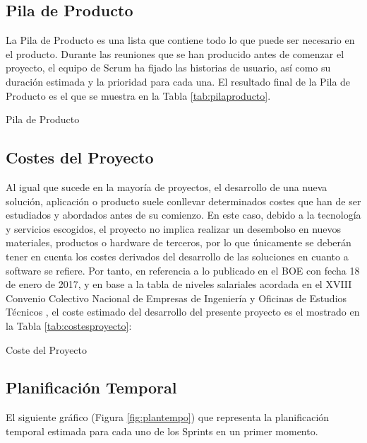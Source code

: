 \subsection{Pila de Producto}
La Pila de Producto es una lista que contiene todo lo que puede ser necesario en el producto. Durante las reuniones que se han producido antes de comenzar el proyecto, el equipo de Scrum ha fijado las historias de usuario, así como su duración estimada y la prioridad para cada una. El resultado final de la Pila de Producto es el que se muestra en la Tabla \ref{tab:pilaproducto}.

\begin{table}[!htbp]
	\centering
	{\small
		
	}
	\caption[Pila de Producto]
	{Pila de Producto}
	\label{tab:pilaproducto}
\end{table}

\clearpage

\subsection{Costes del Proyecto}
Al igual que sucede en la mayoría de proyectos, el desarrollo de una nueva solución, aplicación o producto suele conllevar determinados costes que han de ser estudiados y abordados antes de su comienzo. En este caso, debido a la tecnología y servicios escogidos, el proyecto no implica realizar un desembolso en nuevos materiales, productos o hardware de terceros, por lo que únicamente se deberán tener en cuenta los costes derivados del desarrollo de las soluciones en cuanto a software se refiere. Por tanto, en referencia a lo publicado en el \acf{BOE} con fecha 18 de enero de 2017, y en base a la tabla de niveles salariales acordada en el XVIII Convenio Colectivo Nacional de Empresas de Ingeniería y Oficinas de Estudios Técnicos \cite{BOE2017}, el coste estimado del desarrollo del presente proyecto es el mostrado en la Tabla \ref{tab:costesproyecto}:

\begin{table}[!htbp]
	\centering
	{\small
		
	}
	\caption[Coste del Proyecto]
	{Coste del Proyecto}
	\label{tab:costesproyecto}
\end{table}

\subsection{Planificación Temporal}
El siguiente gráfico (Figura \ref{fig:plantempo}) que representa la planificación temporal estimada para cada uno de los Sprints en un primer momento.

